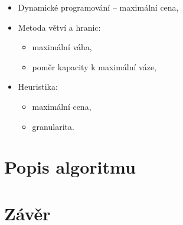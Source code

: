 \documentclass{article}
\begin{document}
\begin{itemize}
    \item Dynamické programování -- maximální cena,
    \item Metoda větví a hranic:
    \begin{itemize}
        \item maximální váha,
        \item poměr kapacity k maximální váze,
    \end{itemize}

    \item Heuristika:
    \begin{itemize}
        \item maximální cena,
        \item granularita.
    \end{itemize}
\end{itemize}

\section{Popis algoritmu}

\section{Závěr}
\end{document}
